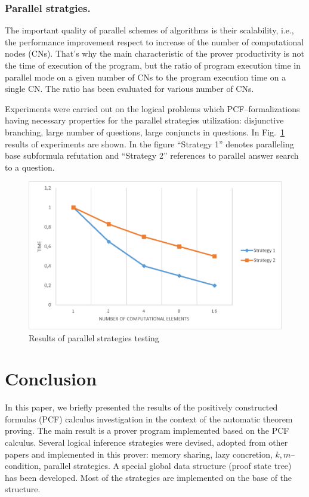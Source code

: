 \documentclass[runningheads,a4paper]{llncs}
\begin{document}
\subsubsection{Parallel stratgies.}
The important quality of parallel schemes of algorithms is their scalability, i.e., the performance improvement respect to increase of the number of computational nodes (CNs). That’s why the main characteristic of the prover productivity is not the time of execution of the program, but the ratio of program execution time in parallel mode on a given number of CNs to the program execution time on a single CN. The ratio has been evaluated for various number of CNs.

Experiments were carried out on the logical problems which PCF--for\-ma\-li\-za\-ti\-ons having necessary properties for the parallel strategies utilization: disjunctive branching, large number of questions, large conjuncts in questions. In Fig.~\ref{fig:parallel} results of experiments are shown. In the figure ``Strategy 1'' denotes paralleling base subformula refutation and ``Strategy 2'' references to parallel answer search to a question.

\begin{figure}[h]
  \centering
  \includegraphics[width=0.8\linewidth]{img/Parallel.eps}
  \caption{Results of parallel strategies testing}
  \label{fig:parallel}
\end{figure}




\section*{Conclusion}
In this paper, we briefly presented the results of the positively constructed formulas (PCF) calculus investigation in the context of the automatic theorem proving. The main result is a prover program implemented based on the PCF calculus. Several logical inference strategies were devised, adopted from other papers and implemented in this prover: memory sharing, lazy concretion, $k,m$--condition, parallel strategies. A special global data structure (proof state tree) has been developed. Most of the strategies are implemented on the base of the structure.
\end{document}
